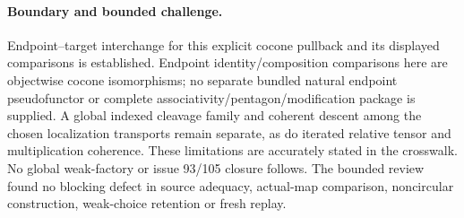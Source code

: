 \documentclass{article}
\begin{document}
\paragraph{Boundary and bounded challenge.} Endpoint--target interchange for this explicit cocone pullback and its displayed comparisons is established. Endpoint identity/composition comparisons here are objectwise cocone isomorphisms; no separate bundled natural endpoint pseudofunctor or complete associativity/pentagon/modification package is supplied. A global indexed cleavage family and coherent descent among the chosen localization transports remain separate, as do iterated relative tensor and multiplication coherence. These limitations are accurately stated in the crosswalk. No global weak-factory or issue 93/105 closure follows. The bounded review found no blocking defect in source adequacy, actual-map comparison, noncircular construction, weak-choice retention or fresh replay.
\end{document}
